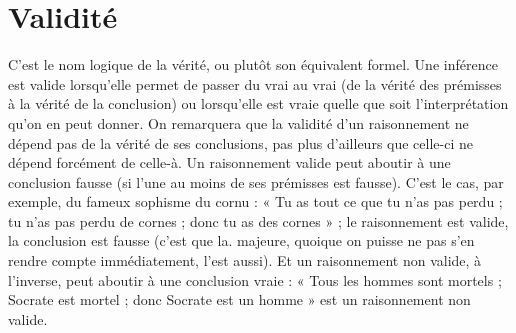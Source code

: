 \section{Validité}
C’est le nom logique de la vérité, ou plutôt son équivalent formel.
Une inférence est valide lorsqu’elle permet de passer du vrai
au vrai (de la vérité des prémisses à la vérité de la conclusion) ou lorsqu'elle est
vraie quelle que soit l'interprétation qu’on en peut donner. On remarquera que
la validité d’un raisonnement ne dépend pas de la vérité de ses conclusions, pas
plus d’ailleurs que celle-ci ne dépend forcément de celle-à. Un raisonnement
valide peut aboutir à une conclusion fausse (si l’une au moins de ses prémisses
est fausse). C’est le cas, par exemple, du fameux sophisme du cornu : « Tu as
tout ce que tu n’as pas perdu ; tu n’as pas perdu de cornes ; donc tu as des
cornes » ; le raisonnement est valide, la conclusion est fausse (c’est que la.
majeure, quoique on puisse ne pas s’en rendre compte immédiatement, l’est
aussi). Et un raisonnement non valide, à l’inverse, peut aboutir à une conclusion
vraie : « Tous les hommes sont mortels ; Socrate est mortel ; donc Socrate
est un homme » est un raisonnement non valide.


